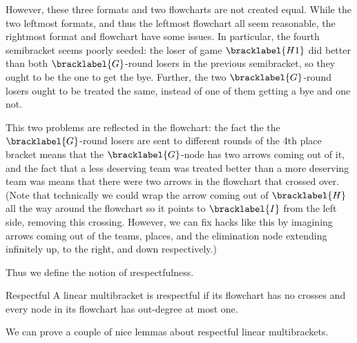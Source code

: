 {    


    However, these three formats and two flowcharts are not created equal. While the two leftmost formats, and thus the leftmost flowchart all seem reasonable, the rightmost format and flowchart have some issues. In particular, the fourth semibracket seems poorly seeded: the loser of game $\bracklabel{H1}$ did better than both $\bracklabel{G}$-round losers in the previous semibracket, so they ought to be the one to get the bye. Further, the two $\bracklabel{G}$-round losers ought to be treated the same, instead of one of them getting a bye and one not.

    This two problems are reflected in the flowchart: the fact the the $\bracklabel{G}$-round losers are sent to different rounds of the 4th place bracket means that the $\bracklabel{G}$-node has two arrows coming out of it, and the fact that a less deserving team was treated better than a more deserving team was means that there were two arrows in the flowchart that crossed over. (Note that technically we could wrap the arrow coming out of $\bracklabel{H}$ all the way around the flowchart so it points to $\bracklabel{I}$ from the left side, removing this crossing. However, we can fix hacks like this by imagining arrows coming out of the teams, places, and the elimination node extending infinitely up, to the right, and down respectively.)

    Thus we define the notion of \i{respectfulness}.

    \begin{definition}{Respectful}{}
        A linear multibracket is \i{respectful} if its flowchart has no crosses and every node in its flowchart has out-degree at most one.
    \end{definition}

    We can prove a couple of nice lemmas about respectful linear multibrackets.


}
